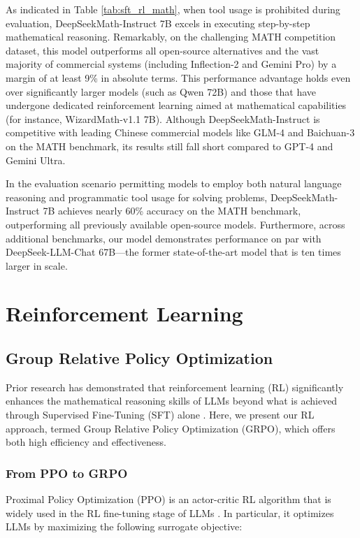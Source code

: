 \begin{itemize}[topsep=0pt]
\begin{itemize}[topsep=0pt]
As indicated in Table \ref{tab:sft_rl_math}, when tool usage is prohibited during evaluation, DeepSeekMath-Instruct 7B excels in executing step-by-step mathematical reasoning. Remarkably, on the challenging MATH competition dataset, this model outperforms all open-source alternatives and the vast majority of commercial systems (including Inflection-2 and Gemini Pro) by a margin of at least 9\% in absolute terms. This performance advantage holds even over significantly larger models (such as Qwen 72B) and those that have undergone dedicated reinforcement learning aimed at mathematical capabilities (for instance, WizardMath-v1.1 7B). Although DeepSeekMath-Instruct is competitive with leading Chinese commercial models like GLM-4 and Baichuan-3 on the MATH benchmark, its results still fall short compared to GPT-4 and Gemini Ultra.

In the evaluation scenario permitting models to employ both natural language reasoning and programmatic tool usage for solving problems, DeepSeekMath-Instruct 7B achieves nearly 60\% accuracy on the MATH benchmark, outperforming all previously available open-source models. Furthermore, across additional benchmarks, our model demonstrates performance on par with DeepSeek-LLM-Chat 67B—the former state-of-the-art model that is ten times larger in scale.
\section{Reinforcement Learning}

\subsection{Group Relative Policy Optimization} Prior research has demonstrated that reinforcement learning (RL) significantly enhances the mathematical reasoning skills of LLMs beyond what is achieved through Supervised Fine-Tuning (SFT) alone \citep{wang2023math,wizardmath}. Here, we present our RL approach, termed Group Relative Policy Optimization (GRPO), which offers both high efficiency and effectiveness.

\subsubsection{From PPO to GRPO} Proximal Policy Optimization (PPO) \citep{schulman2017proximal} is an actor-critic RL algorithm that is widely used in the RL fine-tuning stage of LLMs \citep{ouyang2022training}. In particular, it optimizes LLMs by maximizing the following surrogate objective:


\end{itemize}
\end{itemize}
